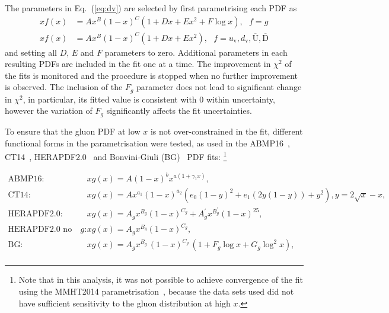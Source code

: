 \documentclass[12pt]{article}
\begin{document}
The parameters in Eq.~(\ref{eq:dv}) are selected by first parametrising each PDF as
\begin{equation}
\begin{split}
xf(x) &= Ax^B(1-x)^C(1+Dx+Ex^2+F {\log x}), ~~~f=g\\
xf(x) &= Ax^B(1-x)^C(1+Dx+Ex^2), 
~~~f=u_\mathrm{v},d_\mathrm{v},\overline{\mathrm{U}},\overline{\mathrm{D}}
\end{split}
\label{eq:de}
\end{equation}
and setting all $D$, $E$ and $F$ parameters to zero.
Additional parameters in each resulting PDFs are included in the fit one at a time. 
The improvement in $\chi^2$ of the fits is monitored and the procedure is stopped when no further improvement is observed. The inclusion of the $F_{g}$ parameter does not lead to significant change in $\chi^2$, in particular, its fitted value is consistent with $0$ within uncertainty, however the variation of $F_{g}$ significantly affects the fit uncertainties.

To ensure that the gluon PDF at low $x$ is not over-constrained in the fit, different functional forms in the parametrisation were tested, as used in the ABMP16~\cite{Alekhin:2017kpj}, CT14~\cite{Dulat:2015mca}, HERAPDF2.0~\cite{Abramowicz:2015mha} and Bonvini-Giuli (BG)~\cite{Bonvini:2019wxf} PDF fits:%
\footnote{Note that in this analysis, it was not possible to achieve convergence of the fit using the MMHT2014 parametrisation~\cite{Harland-Lang:2014zoa}, because the data sets used did not have sufficient sensitivity to the gluon distribution at high $x$.}

\begin{equation}
\begin{aligned}
\textrm{ABMP16:}~~~~~~ &xg(x)=A (1 - x)^b x^{a (1 + \gamma_{1} x)},\\
\textrm{CT14:}~~~~~~ &xg(x) = Ax^{a_1}(1-x)^{a_2}(e_0(1-y)^2+e_1(2y(1-y))+y^2), y=2\sqrt{x}-x,\\
\textrm{HERAPDF2.0:}~~~~~~ &xg(x)=A_gx^{B_g}(1-x)^{C_g}+A^{\prime}_gx^{B^{\prime}_g}(1-x)^{25},\\
\textrm{HERAPDF2.0 no flex. $g$:}~~~~~~ &xg(x)=A_gx^{B_g}(1-x)^{C_g},\\
\textrm{BG:}~~~~~~ &xg(x)=A_{g} x^{B_{g}}\,(1-x)^{C_{g}}\, (1 + F_{g} {\log x} + G_{g} {\log^2 x}),\\
\end{aligned}
\label{eq:gluonpar}
\end{equation}
\end{document}
